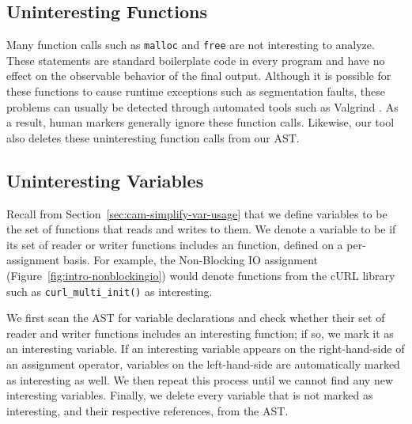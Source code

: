 \subsection{Uninteresting Functions}

Many function calls such as \texttt{malloc} and \texttt{free} are not interesting to analyze. These statements are standard boilerplate code in every program and have no effect on the observable behavior of the final output. Although it is possible for these  functions to cause runtime exceptions such as segmentation faults, these problems can usually be detected through automated tools such as Valgrind \cite{lib-valgrind}. As a result, human markers generally ignore these function calls. Likewise, our tool also deletes these uninteresting function calls from our AST.

\subsection{Uninteresting Variables}

Recall from Section~\ref{sec:cam-simplify-var-usage} that we define variables to be the set of functions that reads and writes to them. We denote a variable to be  if its set of reader or writer functions includes an  function, defined on a per-assignment basis. For example, the Non-Blocking IO assignment (Figure~\ref{fig:intro-nonblockingio}) would denote functions from the cURL library such as \texttt{curl\_multi\_init()} as interesting.

We first scan the AST for variable declarations and check whether their set of reader and writer functions includes an interesting function; if so, we mark it as an interesting variable. If an interesting variable appears on the right-hand-side of an assignment operator, variables on the left-hand-side are automatically marked as interesting as well. We then repeat this process until we cannot find any new interesting variables. Finally, we delete every variable that is not marked as interesting, and their respective references, from the AST.
